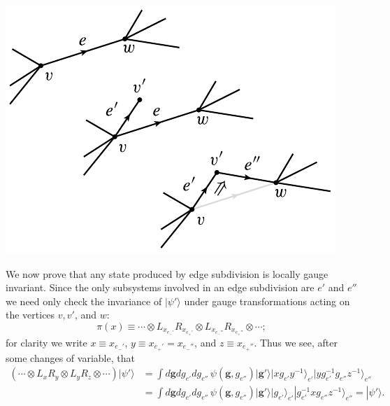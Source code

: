 \documentclass[12pt]{amsart}
\theoremstyle{definition}
\theoremstyle{remark}
\numberwithin{equation}{section}
\begin{document}
\begin{center}
	\includegraphics{edgesubdivide.pdf}
\end{center}

We now prove that any state produced by edge subdivision is locally gauge invariant. Since the only subsystems involved in an edge subdivision are $e'$ and $e''$ we need only check the invariance of $|\psi'\rangle$ under gauge transformations acting on the vertices $v, v'$, and $w$: 
\begin{equation}
	\pi(x) \equiv \cdots \otimes L_{x_{e_-'}}R_{x_{e_+'}}\otimes L_{x_{e_-''}}R_{x_{e_+''}} \otimes \cdots;
\end{equation}
for clarity we write $x \equiv x_{e_-'}$, $y \equiv x_{e_+'} = x_{e_-''}$, and $z \equiv x_{e_+''}$. Thus we see, after some changes of variable, that
\begin{equation}
	\begin{split}
	( \cdots \otimes L_{x}R_{y}\otimes L_{y}R_{z} \otimes \cdots)|\psi'\rangle &= \int d\mathbf{g}dg_{e'}dg_{e''} \, \psi(\mathbf{g},g_{e''}) |\mathbf{g}'\rangle |xg_{e'}y^{-1}\rangle_{e'}  |yg^{-1}_{e'}g_{e''}z^{-1}\rangle_{e''} \\
	&= \int d\mathbf{g}dg_{e'}dg_{e''} \, \psi(\mathbf{g},g_{e''}) |\mathbf{g}'\rangle |g_{e'}\rangle_{e'}  |g^{-1}_{e'}xg_{e''}z^{-1}\rangle_{e''} = |\psi'\rangle.
	\end{split}
\end{equation}
\end{document}
